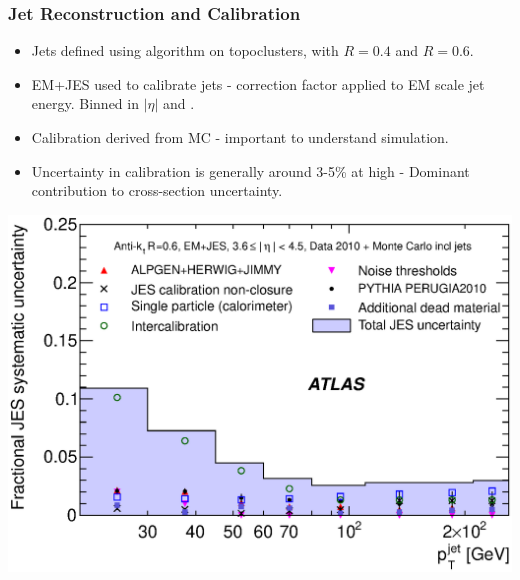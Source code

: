 \documentclass[10pt]{beamer}
\begin{document}
\begin{frame}\frametitle{Jet Reconstruction and Calibration}


\begin{itemize}
\item Jets defined using \akt algorithm on topoclusters, with $R = 0.4$ and $R = 0.6$.
\item EM+JES used to calibrate jets - correction factor applied to EM scale jet energy. Binned in $|\eta|$ and \pt.
\item Calibration derived from MC - important to understand simulation.
\item Uncertainty in calibration is generally around 3-5\% at high \pt - Dominant contribution to cross-section uncertainty.
\end{itemize}
\includegraphics[width=0.6\linewidth,angle=0]{JES_new/fig_22c.eps}

\end{frame}
\end{document}

